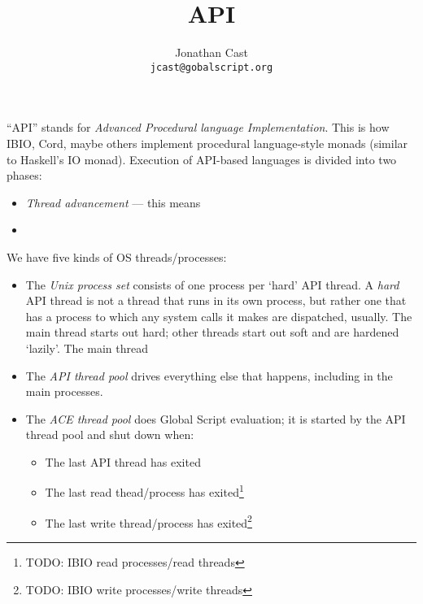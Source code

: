 \documentclass{article}
\title{API}
\author{Jonathan Cast\\\texttt{jcast@gobalscript.org}}
\newcommand\defn[1]{\emph{#1}}
\newcommand\TODO[1]{\footnote{TODO: #1}}
\begin{document}
\maketitle

``API'' stands for \defn{Advanced Procedural language Implementation}.
This is how IBIO, Cord, maybe others implement procedural language-style monads (similar to Haskell's IO monad).
Execution of API-based languages is divided into two phases:
\begin{itemize}
    \item \defn{Thread advancement} --- this means 
    \item
\end{itemize}

We have five kinds of OS threads/processes:
\begin{itemize}
    \item The \defn{Unix process set} consists of one process per `hard' API thread.
        A \defn{hard} API thread is not a thread that runs in its own process,
        but rather one that has a process to which any system calls it makes are dispatched, usually.
        The main thread starts out hard; other threads start out soft and are hardened `lazily'.
        The main thread
    \item The \defn{API thread pool} drives everything else that happens, including in the main processes.
    \item The \defn{ACE thread pool} does Global Script evaluation;
        it is started by the API thread pool and shut down when:
        \begin{itemize}
            \item The last API thread has exited
            \item The last read thead/process has exited\TODO{IBIO read processes/read threads}
            \item The last write thread/process has exited\TODO{IBIO write processes/write threads}
        \end{itemize}
\end{itemize}
\end{document}
